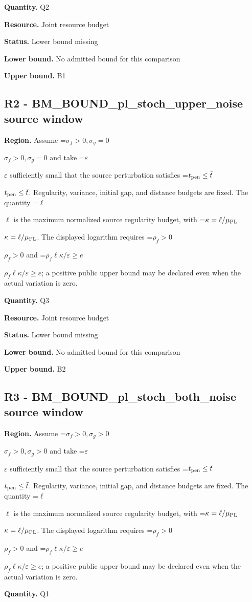 \documentclass[10pt,a4paper]{article}
\newcommand{\AtlasMath}[1]{\par\begingroup\centering\setbox0=\hbox{$\displaystyle #1$}\ifdim\wd0>1.4\linewidth\typeout{ATLAS WIDE FORMULA: \the\wd0}\fi\ifdim\wd0>\linewidth\resizebox{\linewidth}{!}{\box0}\else\box0\fi\par\endgroup}
\newcommand{\AtlasInlineMath}[1]{\begingroup\setbox0=\hbox{$#1$}\ifdim\wd0>.4\linewidth\endgroup\AtlasMath{#1}\else\endgroup$#1$\fi}
\begin{document}
\textbf{Quantity.} Q2

\textbf{Resource.} Joint resource budget

\textbf{Status.} Lower bound missing

\textbf{Lower bound.} No admitted bound for this comparison

\textbf{Upper bound.} B1

\subsection{R2 - BM\_BOUND\_pl\_stoch\_upper\_noise source window}
\textbf{Region.} Assume \AtlasInlineMath{\sigma_f>0,\sigma_g=0} and take \AtlasInlineMath{\varepsilon} sufficiently small that the source perturbation satisfies \AtlasInlineMath{t_{\rm pen}\le\bar t}. Regularity, variance, initial gap, and distance budgets are fixed. The quantity \AtlasInlineMath{\ell} is the maximum normalized source regularity budget, with \AtlasInlineMath{\kappa=\ell/\mu_{\rm PL}}. The displayed logarithm requires \AtlasInlineMath{\rho_f>0} and \AtlasInlineMath{\rho_f\ell\kappa/\varepsilon\ge e}; a positive public upper bound may be declared even when the actual variation is zero.

\textbf{Quantity.} Q3

\textbf{Resource.} Joint resource budget

\textbf{Status.} Lower bound missing

\textbf{Lower bound.} No admitted bound for this comparison

\textbf{Upper bound.} B2

\subsection{R3 - BM\_BOUND\_pl\_stoch\_both\_noise source window}
\textbf{Region.} Assume \AtlasInlineMath{\sigma_f>0,\sigma_g>0} and take \AtlasInlineMath{\varepsilon} sufficiently small that the source perturbation satisfies \AtlasInlineMath{t_{\rm pen}\le\bar t}. Regularity, variance, initial gap, and distance budgets are fixed. The quantity \AtlasInlineMath{\ell} is the maximum normalized source regularity budget, with \AtlasInlineMath{\kappa=\ell/\mu_{\rm PL}}. The displayed logarithm requires \AtlasInlineMath{\rho_f>0} and \AtlasInlineMath{\rho_f\ell\kappa/\varepsilon\ge e}; a positive public upper bound may be declared even when the actual variation is zero.

\textbf{Quantity.} Q1
\end{document}
